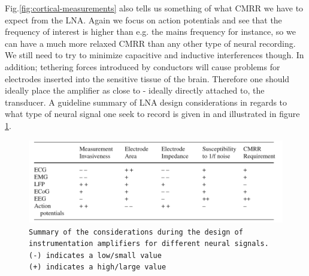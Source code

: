    Fig.\ref{fig:cortical-measurements} also tells us something of what \acf{CMRR} we have to expect from the LNA. Again we focus on action potentials and see that the frequency of interest is higher than e.g. the mains frequency for instance, so we can have a much more relaxed \acs{CMRR} than any other type of neural recording. We still need to try to minimize capacitive and inductive interferences though. In addition; tethering forces introduced by conductors will cause problems for electrodes inserted into the sensitive tissue of the brain. Therefore one should ideally place the amplifier as close to - ideally directly attached to, the transducer. A guideline summary of LNA design considerations in regards to what type of neural signal one seek to record is given in \cite{yoo2011biomedical-cmos} and illustrated in figure \ref{tab:lna-design-considerations}.
    \begin{figure}
      \centering
      \includegraphics[scale=.5]{images/table-LNA-design-considerations.png}
      \captionsetup{singlelinecheck=off}
      \caption[dummy]{\texttt{\footnotesize{Summary of the considerations during the design of instrumentation amplifiers for different neural signals.\\
					      (-) indicates a low/small value \\
					      (+) indicates a high/large value}}}
      \label{tab:lna-design-considerations}
      \end{figure}
       
